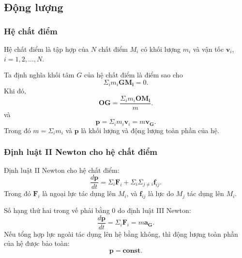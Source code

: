 \subsection{Động lượng}
\begin{frame}
    \frametitle{Hệ chất điểm}
    Hệ chất điểm là tập hợp của \(N\) chất điểm \(M_i\) có khối lượng \(m_i\) và vận tốc \(\mathbf{v}_i\), \(i=1,2,\ldots,N\).

    Ta định nghĩa khối tâm \(G\) của hệ chất điểm là điểm sao cho
    \begin{equation}
    \Sigma_i m_i \mathbf{GM_i} = 0.
    \end{equation}
    Khi đó,
    \begin{equation}
    \mathbf{OG} = \frac{\Sigma_i m_i \mathbf{OM_i}}{m}.
    \end{equation}
    và
    \begin{equation}
        \mathbf p=\Sigma_i m_i \mathbf{v}_i = m\mathbf{v_G}.
    \end{equation}
    Trong đó \(m=\Sigma_i m_i\) và \(\mathbf p\) là khối lượng và động lượng toàn phần của hệ.
\end{frame}

\begin{frame}
    \frametitle{Định luật II Newton cho hệ chất điểm}
    Định luật II Newton cho hệ chất điểm:
    \begin{equation}
        \frac{d\mathbf p}{dt} = \Sigma_i \mathbf{F}_i + \Sigma_i \Sigma_{j\neq i} \mathbf{f}_{ij}.
    \end{equation}
    Trong đó \(\mathbf{F}_i\) là ngoại lực tác dụng lên \(M_i\), và \(\mathbf{f}_{ij}\) là lực do \(M_j\) tác dụng lên \(M_i\).

    Số hạng thứ hai trong vế phải bằng 0 do định luật III Newton:
    \begin{equation}
        \frac{d\mathbf p}{dt}=\Sigma_i \mathbf{F}_i=m\mathbf{a_G}.
    \end{equation}
    Nếu tổng hợp lực ngoài tác dụng lên hệ bằng không, thì động lượng toàn phần của hệ được bảo toàn:
        \begin{equation}
            \mathbf p = \textbf{const}.
        \end{equation}
\end{frame}

